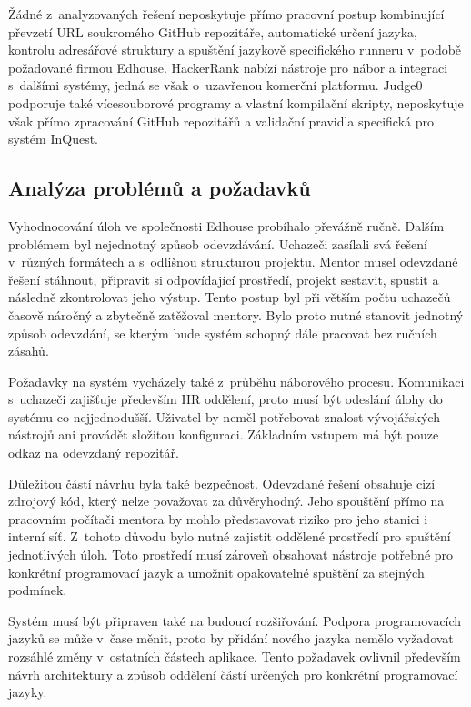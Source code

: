 \documentclass[
  biblatex,
  figures,
  tables,
  glossaries,
  index
]{kidiplom}
\begin{document}
Žádné z~analyzovaných řešení neposkytuje přímo pracovní postup kombinující převzetí URL soukromého GitHub repozitáře, automatické určení jazyka, kontrolu adresářové struktury a spuštění jazykově specifického runneru v~podobě požadované firmou Edhouse. HackerRank nabízí nástroje pro nábor a integraci s~dalšími systémy, jedná se však o~uzavřenou komerční platformu. Judge0 podporuje také vícesouborové programy a vlastní kompilační skripty, neposkytuje však přímo zpracování GitHub repozitářů a validační pravidla specifická pro systém InQuest.


\subsection{Analýza problémů a požadavků}
Vyhodnocování úloh ve společnosti Edhouse probíhalo převážně ručně. Dalším problémem byl nejednotný způsob odevzdávání. Uchazeči zasílali svá řešení v~různých formátech a s~odlišnou strukturou projektu. Mentor musel odevzdané řešení stáhnout, připravit si odpovídající prostředí, projekt sestavit, spustit a následně zkontrolovat jeho výstup. Tento postup byl při větším počtu uchazečů časově náročný a zbytečně zatěžoval mentory. Bylo proto nutné stanovit jednotný způsob odevzdání, se kterým bude systém schopný dále pracovat bez ručních zásahů.

Požadavky na systém vycházely také z~průběhu náborového procesu. Komunikaci s~uchazeči zajišťuje především HR oddělení, proto musí být odeslání úlohy do systému co nejjednodušší. Uživatel by neměl potřebovat znalost vývojářských nástrojů ani provádět složitou konfiguraci. Základním vstupem má být pouze odkaz na odevzdaný repozitář.

Důležitou částí návrhu byla také bezpečnost. Odevzdané řešení obsahuje cizí zdrojový kód, který nelze považovat za důvěryhodný. Jeho spouštění přímo na pracovním počítači mentora by mohlo představovat riziko pro jeho stanici i interní síť. Z~tohoto důvodu bylo nutné zajistit oddělené prostředí pro spuštění jednotlivých úloh. Toto prostředí musí zároveň obsahovat nástroje potřebné pro konkrétní programovací jazyk a umožnit opakovatelné spuštění za stejných podmínek.

Systém musí být připraven také na budoucí rozšiřování. Podpora programovacích jazyků se může v~čase měnit, proto by přidání nového jazyka nemělo vyžadovat rozsáhlé změny v~ostatních částech aplikace. Tento požadavek ovlivnil především návrh architektury a způsob oddělení částí určených pro konkrétní programovací jazyky.
\end{document}
